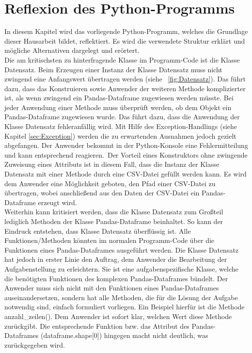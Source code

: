 \documentclass[11pt,a4paper]{scrreprt}
\newcommand{\abbildung}[1]{\figurename\ \ref{#1}}
\begin{document}
\chapter{Reflexion des Python-Programms}
\label{cha:Reflexion}
In diesem Kapitel wird das vorliegende Python-Programm, welches die Grundlage dieser Hausarbeit bildet, reflektiert. Es wird die verwendete Struktur erklärt und mögliche Alternativen dargelegt und erörtert. \\
Die am kritischsten zu hinterfragende Klasse im Programm-Code ist die Klasse Datensatz. Beim Erzeugen einer Instanz der Klasse Datensatz muss nicht zwingend eine Anfangswert übertragen werden (siehe \abbildung{fig:Datensatz}). Das führt dazu, dass das Konstruieren sowie Anwender der weiteren Methode komplizierter ist, als wenn zwingend ein Pandas-Dataframe zugewiesen werden müsste. Bei jeder Anwendung einer Methode muss überprüft werden, ob dem Objekt ein Pandas-Dataframe zugewiesen wurde. Das führt dazu, dass die Anwendung der Klasse Datensatz fehleranfällig wird. Mit Hilfe des Exception-Handlings (siehe Kapitel \ref{sec:Exception}) werden die zu erwartenden Ausnahmen jedoch gezielt abgefangen. Der Anwender bekommt in der Python-Konsole eine Fehlermitteilung und kann entsprechend reagieren.\
Der Vorteil eines Konstruktors ohne zwingende Zuweisung eines Attributs ist in diesem Fall, dass die Instanz der Klasse Datensatz mit einer Methode durch eine CSV-Datei gefüllt werden kann. Es wird dem Anwender eine Möglichkeit geboten, den Pfad einer CSV-Datei zu übertragen, wobei anschließend aus den Daten der CSV-Datei ein Pandas-Dataframe erzeugt wird.\\
Weiterhin kann kritisiert werden, dass die Klasse Datensatz zum Großteil lediglich Methoden der Klasse Pandas-Dataframe beinhaltet. So kann der Eindruck entstehen, dass Klasse Datensatz überflüssig ist. Alle Funktionen/Methoden könnten im normalen Programm-Code über die Funktionen eines Pandas-Dataframes ausgeführt werden. Die Klasse Datensatz hat jedoch in erster Linie den Auftrag, dem Anwender die Bearbeitung der Aufgabenstellung zu erleichtern. Sie ist eine aufgabenspezifische Klasse, welche die benötigten Funktionen des komplexen Pandas-Dataframes bündelt. Der Anwender muss sich nicht mit den Funktionen eines Pandas-Dataframes auseinandersetzen, sondern hat alle Methoden, die für die Lösung der Aufgabe notwendig sind, einfach formuliert vorliegen. Ein Beispiel hierfür ist die Methode anzahl\_zeilen(). Dem Anwender ist sofort klar, welchen Wert diese Methode zurückgibt. Die entsprechende Funktion bzw. das Attribut des Pandas-Dataframes (dataframe.shape[0]) hingegen macht nicht deutlich, was zurückgegeben wird. \\
\end{document}
